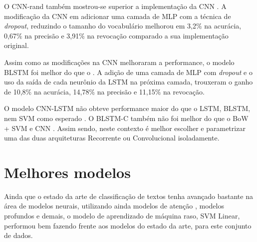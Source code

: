 O CNN-rand também mostrou-se superior a implementação da CNN \cite{da_silva_document_2018}. A modificação da CNN em adicionar uma camada de MLP com a técnica de \textit{dropout}, reduzindo o tamanho do vocabulário melhorou em 3,2$\%$ na acurácia, 0,67$\%$ na precisão e 3,91$\%$ na revocação comparado a sua implementação original.

Assim como as modificações na CNN melhoraram a performance, o modelo BLSTM foi melhor do que o . A adição de uma camada de MLP com \textit{dropout} e o uso da saída de cada neurônio da LSTM na próxima camada, trouxeram o ganho de 10,8$\%$ na acurácia, 14,78$\%$ na precisão e 11,15$\%$ na revocação.

O modelo CNN-LSTM não obteve performance maior do que o LSTM, BLSTM, nem SVM como esperado \cite{zhou_c-lstm_2015}. O BLSTM-C também não foi melhor do que o BoW + SVM e CNN \cite{lai_recurrent_2015}. Assim sendo, neste contexto é melhor escolher e parametrizar uma das duas arquiteturas Recorrente ou Convolucional isoladamente.

\section{Melhores modelos}

Ainda que o estado da arte de classificação de textos tenha avançado bastante na área de modelos neurais, utilizando ainda modelos de atenção \cite{yang_hierarchical_2016,tang_document_2015}, modelos profundos \cite{conneau_very_2017} e demais, o modelo de aprendizado de máquina raso, SVM Linear, performou bem fazendo frente aos modelos do estado da arte, para este conjunto de dados.

